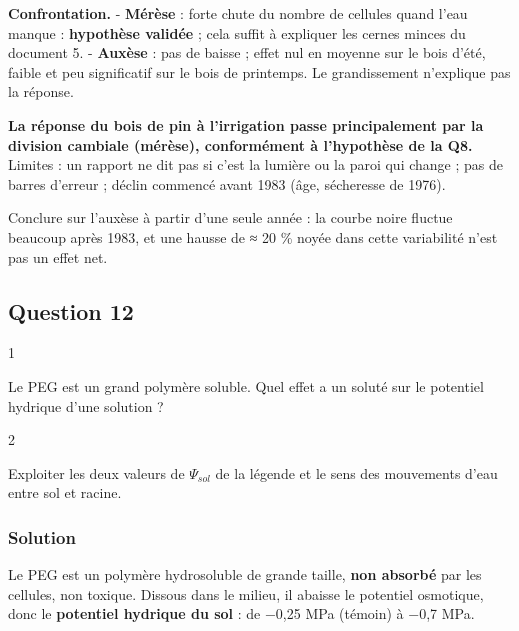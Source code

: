 \documentclass[11pt,a4paper]{article}
\begin{document}
\textbf{Confrontation.}
- \textbf{Mérèse} : forte chute du nombre de cellules quand l'eau manque : \textbf{hypothèse validée} ; cela suffit à expliquer les cernes minces du document 5.
- \textbf{Auxèse} : pas de baisse ; effet nul en moyenne sur le bois d'été, faible et peu significatif sur le bois de printemps. Le grandissement n'explique pas la réponse.

\textbf{La réponse du bois de pin à l'irrigation passe principalement par la division cambiale (mérèse), conformément à l'hypothèse de la Q8.} Limites : un rapport ne dit pas si c'est la lumière ou la paroi qui change ; pas de barres d'erreur ; déclin commencé avant 1983 (âge, sécheresse de 1976).

\begin{piege}

Conclure sur l'auxèse à partir d'une seule année : la courbe noire fluctue beaucoup après 1983, et une hausse de ≈ 20 \% noyée dans cette variabilité n'est pas un effet net.

\end{piege}

\hypertarget{question-12}{%
\subsection{Question 12}\label{question-12}}

\begin{indication}{1}

Le PEG est un grand polymère soluble. Quel effet a un soluté sur le potentiel hydrique d'une solution ?

\end{indication}

\begin{indication}{2}

Exploiter les deux valeurs de \(\Psi_{sol}\) de la légende et le sens des mouvements d'eau entre sol et racine.

\end{indication}

\hypertarget{solution-11}{%
\subsubsection{Solution}\label{solution-11}}

Le PEG est un polymère hydrosoluble de grande taille, \textbf{non absorbé} par les cellules, non toxique. Dissous dans le milieu, il abaisse le potentiel osmotique, donc le \textbf{potentiel hydrique du sol} : de −0,25 MPa (témoin) à −0,7 MPa.
\end{document}

